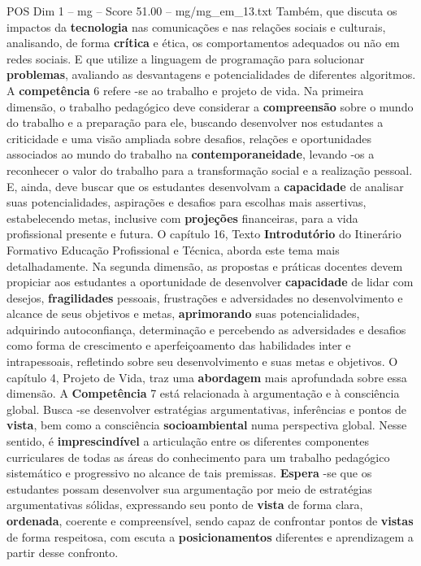 \begin{textsample}{POS Dim 1 – mg – Score 51.00 – mg/mg\_em\_13.txt}
Também, que discuta os impactos da \textbf{tecnologia} nas comunicações e nas relações sociais e culturais, analisando, de forma \textbf{crítica} e ética, os comportamentos adequados ou não em redes sociais.
E que utilize a linguagem de programação para solucionar \textbf{problemas}, avaliando as desvantagens e potencialidades de diferentes algoritmos.
A \textbf{competência} 6 refere -se ao trabalho e projeto de vida.
Na primeira dimensão, o trabalho pedagógico deve considerar a \textbf{compreensão} sobre o mundo do trabalho e a preparação para ele, buscando desenvolver nos estudantes a criticidade e uma visão ampliada sobre desafios, relações e oportunidades associados ao mundo do trabalho na \textbf{contemporaneidade}, levando -os a reconhecer o valor do trabalho para a transformação social e a realização pessoal.
E, ainda, deve buscar que os estudantes desenvolvam a \textbf{capacidade} de analisar suas potencialidades, aspirações e desafios para escolhas mais assertivas, estabelecendo metas, inclusive com \textbf{projeções} financeiras, para a vida profissional presente e futura.
O capítulo 16, Texto \textbf{Introdutório} do Itinerário Formativo Educação Profissional e Técnica, aborda este tema mais detalhadamente.
Na segunda dimensão, as propostas e práticas docentes devem propiciar aos estudantes a oportunidade de desenvolver \textbf{capacidade} de lidar com desejos, \textbf{fragilidades} pessoais, frustrações e adversidades no desenvolvimento e alcance de seus objetivos e metas, \textbf{aprimorando} suas potencialidades, adquirindo autoconfiança, determinação e percebendo as adversidades e desafios como forma de crescimento e aperfeiçoamento das habilidades inter e intrapessoais, refletindo sobre seu desenvolvimento e suas metas e objetivos.
O capítulo 4, Projeto de Vida, traz uma \textbf{abordagem} mais aprofundada sobre essa dimensão.
A \textbf{Competência} 7 está relacionada à argumentação e à consciência global.
Busca -se desenvolver estratégias argumentativas, inferências e pontos de \textbf{vista}, bem como a consciência \textbf{socioambiental} numa perspectiva global.
Nesse sentido, é \textbf{imprescindível} a articulação entre os diferentes componentes curriculares de todas as áreas do conhecimento para um trabalho pedagógico sistemático e progressivo no alcance de tais premissas. \textbf{Espera} -se que os estudantes possam desenvolver sua argumentação por meio de estratégias argumentativas sólidas, expressando seu ponto de \textbf{vista} de forma clara, \textbf{ordenada}, coerente e compreensível, sendo capaz de confrontar pontos de \textbf{vistas} de forma respeitosa, com escuta a \textbf{posicionamentos} diferentes e aprendizagem a partir desse confronto.

\end{textsample}
